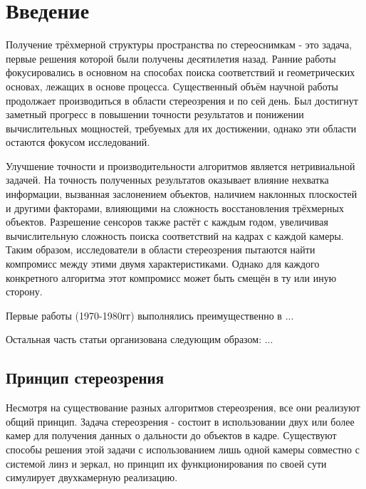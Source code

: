 





\tableofcontents
\newpage


\section{Введение}

Получение трёхмерной структуры пространства по стереоснимкам - это задача, первые решения которой
были получены десятилетия назад. Ранние работы фокусировались в основном на способах поиска соответствий
и геометрических основах, лежащих в основе процесса. Существенный объём научной работы продолжает
 производиться в области стереозрения и по сей день. Был достигнут заметный прогресс в повышении точности результатов и понижении вычислительных мощностей, требуемых для 
их достижении, однако эти области остаются фокусом исследований. 

Улучшение точности и производительности алгоритмов является нетривиальной задачей. На точность 
полученных результатов оказывает влияние нехватка информации, вызванная заслонением объектов, наличием наклонных
плоскостей и другими факторами, влияющими на сложность восстановления трёхмерных объектов. Разрешение
сенсоров также растёт с каждым годом, увеличивая вычислительную сложность поиска соответствий на кадрах с 
каждой камеры. Таким образом, исследователи в области стереозрения пытаются найти компромисс между этими
 двумя характеристиками. Однако для каждого конкретного алгоритма этот компромисс может быть смещён в 
 ту или иную сторону. 

Первые работы (1970-1980гг) выполнялись преимущественно в ...


Остальная часть статьи организована следующим образом:
...

\subsection{Принцип стереозрения}

Несмотря на существование разных алгоритмов стереозрения, все они реализуют общий принцип. Задача стереозрения - 
 состоит в использовании двух или более камер для получения данных о дальности до объектов в кадре. Существуют способы \cite{singlecamrev} решения
 этой задачи с использованием лишь одной камеры совместно с системой линз и зеркал, но принцип их функционирования по своей сути 
 симулирует двухкамерную реализацию.  %


